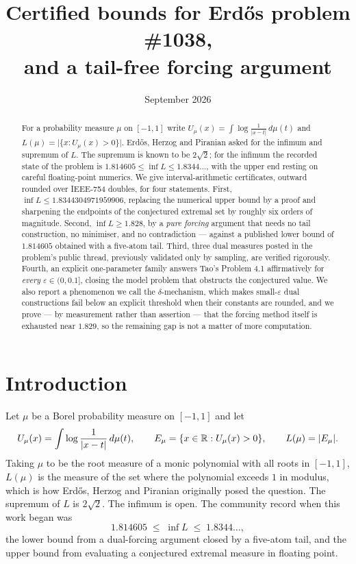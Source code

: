 \documentclass[11pt]{article}
\title{Certified bounds for Erd\H{o}s problem \#1038,\\
and a tail-free forcing argument}
\author{\cmauthor}
\date{September 2026}
\begin{document}
\maketitle

\begin{abstract}
For a probability measure $\mu$ on $[-1,1]$ write
$U_\mu(x)=\int\log\frac{1}{|x-t|}\,d\mu(t)$ and
$L(\mu)=\lvert\{x: U_\mu(x)>0\}\rvert$. Erd\H{o}s, Herzog and Piranian
asked for the infimum and supremum of $L$. The supremum is known to be
$2\sqrt2$; for the infimum the recorded state of the problem is
$1.814605\le\inf L\le 1.8344\ldots$, with the upper end resting on
careful floating-point numerics. We give interval-arithmetic
certificates, outward rounded over IEEE-754 doubles, for four
statements. First, $\inf L\le 1.8344304971959906$, replacing the
numerical upper bound by a proof and sharpening the endpoints of the
conjectured extremal set by roughly six orders of magnitude. Second,
$\inf L\ge 1.828$, by a \emph{pure forcing} argument that needs no tail
construction, no minimiser, and no contradiction --- against a published
lower bound of $1.814605$ obtained with a five-atom tail. Third, three
dual measures posted in the problem's public thread, previously
validated only by sampling, are verified rigorously. Fourth, an explicit
one-parameter family answers Tao's Problem 4.1 affirmatively for
\emph{every} $\varepsilon\in(0,0.1]$, closing the model problem that
obstructs the conjectured value. We also report a phenomenon we call the
$\delta$-mechanism, which makes small-$\varepsilon$ dual constructions
fail below an explicit threshold when their constants are rounded, and
we prove --- by measurement rather than assertion --- that the forcing
method itself is exhausted near $1.829$, so the remaining gap is not a
matter of more computation.
\end{abstract}

\section{Introduction}

Let $\mu$ be a Borel probability measure on $[-1,1]$ and let
\[
  U_\mu(x)=\int \log\frac{1}{|x-t|}\,d\mu(t),
  \qquad
  E_\mu=\{x\in\mathbb{R}: U_\mu(x)>0\},
  \qquad
  L(\mu)=\lvert E_\mu\rvert .
\]
Taking $\mu$ to be the root measure of a monic polynomial with all roots
in $[-1,1]$, $L(\mu)$ is the measure of the set where the polynomial
exceeds $1$ in modulus, which is how Erd\H{o}s, Herzog and Piranian
originally posed the question. The supremum of $L$ is $2\sqrt2$. The
infimum is open. The community record when this work began was
\[
  1.814605 \;\le\; \inf L \;\le\; 1.8344\ldots,
\]
the lower bound from a dual-forcing argument closed by a five-atom tail,
and the upper bound from evaluating a conjectured extremal measure in
floating point.
\end{document}
